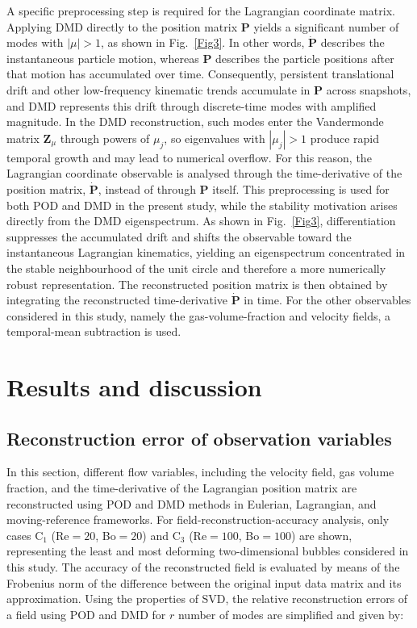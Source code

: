 \documentclass[a4paper,fleqn]{cas-sc}
\begin{document}
	A specific preprocessing step is required for the Lagrangian coordinate matrix. Applying DMD directly to the position matrix $\mathbf{P}$ yields a significant number of modes with $|\mu|>1$, as shown in Fig.~\ref{Fig3}. In other words, $\dot{\mathbf{P}}$ describes the instantaneous particle motion, whereas $\mathbf{P}$ describes the particle positions after that motion has accumulated over time. Consequently, persistent translational drift and other low-frequency kinematic trends accumulate in $\mathbf{P}$ across snapshots, and DMD represents this drift through discrete-time modes with amplified magnitude. In the DMD reconstruction, such modes enter the Vandermonde matrix $\mathbf{Z}_{\mu}$ through powers of $\mu_j$, so eigenvalues with $|\mu_j|>1$ produce rapid temporal growth and may lead to numerical overflow. For this reason, the Lagrangian coordinate observable is analysed through the time-derivative of the position matrix, $\dot{\mathbf{P}}$, instead of through $\mathbf{P}$ itself. This preprocessing is used for both POD and DMD in the present study, while the stability motivation arises directly from the DMD eigenspectrum. As shown in Fig.~\ref{Fig3}, differentiation suppresses the accumulated drift and shifts the observable toward the instantaneous Lagrangian kinematics, yielding an eigenspectrum concentrated in the stable neighbourhood of the unit circle and therefore a more numerically robust representation. The reconstructed position matrix is then obtained by integrating the reconstructed time-derivative $\dot{\mathbf{P}}$ in time. For the other observables considered in this study, namely the gas-volume-fraction and velocity fields, a temporal-mean subtraction is used.
	
	\section{Results and discussion}
	\label{Results and discussion}
	
	
	\subsection{Reconstruction error of observation variables}
	
	In this section, different flow variables, including the velocity field, gas volume fraction, and the time-derivative of the Lagrangian position matrix are reconstructed using POD and DMD methods in Eulerian, Lagrangian, and moving-reference frameworks. For field-reconstruction-accuracy analysis, only cases C$_1$ (Re$=20$, Bo$=20$) and C$_3$ (Re$=100$, Bo$=100$) are shown, representing the least and most deforming two-dimensional bubbles considered in this study. The accuracy of the reconstructed field is evaluated by means of the Frobenius norm of the difference between the original input data matrix and its approximation. Using the properties of SVD, the relative reconstruction errors of a field using POD and DMD for $r$ number of modes are simplified and given by:
	
\end{document}
